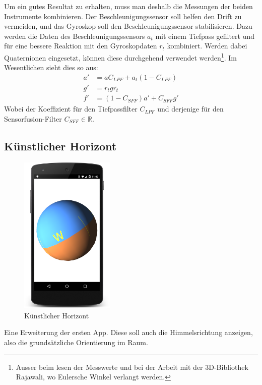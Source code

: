 \documentclass[12pt]{article}
\begin{document}
  Um ein gutes Resultat zu erhalten, muss man deshalb die Messungen der beiden Instrumente kombinieren. Der Beschleunigungssensor soll helfen den Drift zu vermeiden, und das Gyroskop soll den Beschleunigungssensor stabilisieren. Dazu werden die Daten des Beschleunigungssensors $a_t$ mit einem Tiefpass gefiltert und für eine bessere Reaktion mit den Gyroskopdaten $r_t$ kombiniert. Werden dabei Quaternionen eingesetzt, können diese durchgehend verwendet werden\footnote{Ausser beim lesen der Messwerte und bei der Arbeit mit der 3D-Bibliothek Rajawali, wo Eulersche Winkel verlangt werden.}. Im Wesentlichen sieht dies so aus:
  \begin{align*}
    a' &= a C_{LPF} +  a_t (1 - C_{LPF}) \\
    g' &= r_t g \bar{r_t}    \\
    f' &= (1 - C_{SFF}) a' + C_{SFF} g'
  \end{align*}
  Wobei der Koeffizient für den Tiefpassfilter $C_{LPF}$ und derjenige für den Sensorfusion-Filter $C_{SFF} \in \mathbb{R}$.


  \subsection{Künstlicher Horizont}

\begin{figure}
    \vspace{-12pt}
    \centering
    \includegraphics[width=0.4\textwidth]{artificial-horizon.png}
    \vspace{-18pt}
    \caption{Künstlicher Horizont}
    \label{fig:screenshot_artificial_horizon}
    \vspace{-10pt}
\end{figure}
  Eine Erweiterung der ersten App. Diese soll auch die Himmelsrichtung anzeigen, also die grundsätzliche Orientierung im Raum.
\end{document}
